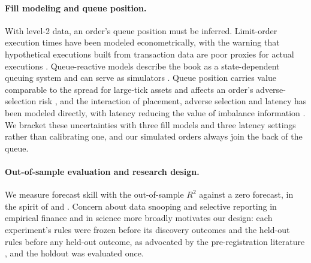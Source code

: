 \documentclass[11pt]{article}
\begin{document}
\paragraph{Fill modeling and queue position.} With level-2 data, an order's queue position must be inferred. Limit-order
execution times have been modeled econometrically, with the warning that hypothetical executions built from transaction
data are poor proxies for actual executions \citep{lo2002}. Queue-reactive models describe the book as a state-dependent
queuing system and can serve as simulators \citep{huang2015}. Queue position carries value comparable to the spread for
large-tick assets \citep{moallemi2017} and affects an order's adverse-selection risk \citep{garriott2025}, and the interaction
of placement, adverse selection and latency has been modeled directly, with latency reducing the value of imbalance
information \citep{lehalle2017}. We bracket these uncertainties with three fill models and three latency settings rather
than calibrating one, and our simulated orders always join the back of the queue.

\paragraph{Out-of-sample evaluation and research design.} We measure forecast skill with the out-of-sample $R^2$ against a
zero forecast, in the spirit of \citet{campbell2008} and \citet{welch2008}. Concern about data snooping and selective
reporting in empirical finance \citep{white2000,harvey2016,bailey2014,bailey2017} and in science more broadly
\citep{ioannidis2005} motivates our design: each experiment's rules were frozen before its discovery outcomes and the
held-out rules before any held-out outcome, as advocated by the pre-registration literature \citep{nosek2018}, and the
holdout was evaluated once.
\end{document}
